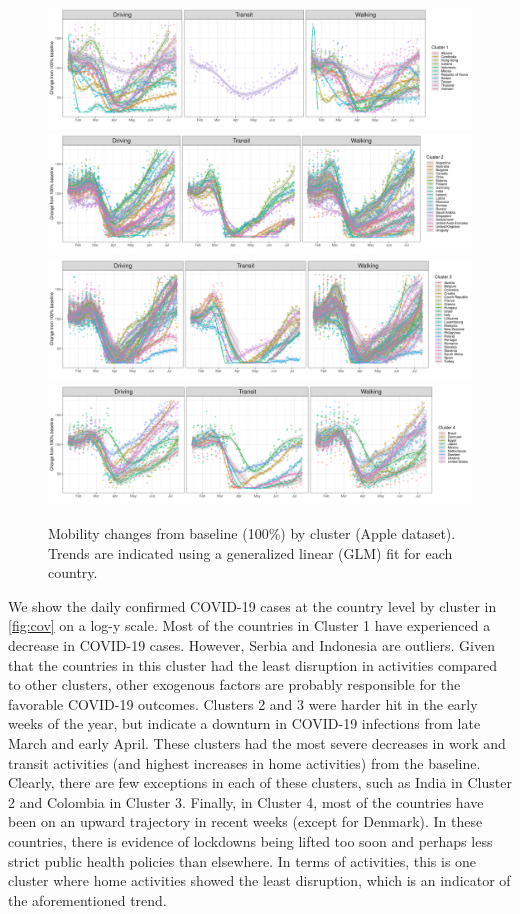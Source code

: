 \documentclass[preprint, 12pt]{elsarticle}
\newcommand{\?}{\stackrel{?}{=}}
\begin{document}
\begin{figure}[h!]
  \centering
  \includegraphics[width=.9\textwidth]{c1-mobility}
  \includegraphics[width=.9\textwidth]{c2-mobility}
  \includegraphics[width=.9\textwidth]{c3-mobility}
  \includegraphics[width=.9\textwidth]{c4-mobility}
  \caption{Mobility changes from baseline (100\%) by cluster (Apple dataset). Trends are indicated using a generalized linear (GLM) fit for each country.}
  \label{fig:mob}
\end{figure}


We show the daily confirmed COVID-19 cases at the country level by cluster in \autoref{fig:cov} on a log-y scale.
Most of the countries in Cluster 1 have experienced a decrease in COVID-19 cases.
However, Serbia and Indonesia are outliers.
Given that the countries in this cluster had the least disruption in activities compared to other clusters, other exogenous factors are probably responsible for the favorable COVID-19 outcomes.
Clusters 2 and 3 were harder hit in the early weeks of the year, but indicate a downturn in COVID-19 infections from late March and early April.
These clusters had the most severe decreases in work and transit activities (and highest increases in home activities) from the baseline.
Clearly, there are few exceptions in each of these clusters, such as India in Cluster 2 and Colombia in Cluster 3.
Finally, in Cluster 4, most of the countries have been on an upward trajectory in recent weeks (except for Denmark).
In these countries, there is evidence of lockdowns being lifted too soon and perhaps less strict public health policies than elsewhere.
In terms of activities, this is one cluster where home activities showed the least disruption, which is an indicator of the aforementioned trend.
\end{document}
